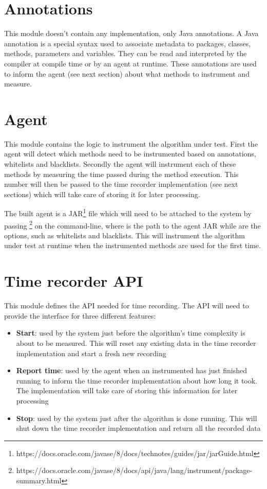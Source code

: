 \section{Annotations}
\label{sec:design:annotations}
This module doesn't contain any implementation, only Java annotations. A Java annotation is a special syntax used to associate metadata to packages, classes, methods, parameters and variables. They can be read and interpreted by the compiler at compile time or by an agent at runtime. These annotations are used to inform the agent (see next section) about what methods to instrument and measure.


\section{Agent}
\label{sec:design:agent}
This module contains the logic to instrument the algorithm under test. First the agent will detect which methods need to be instrumented based on annotations, whitelists and blacklists. Secondly the agent will instrument each of these methods by measuring the time passed during the method execution. This number will then be passed to the time recorder implementation (see next sections) which will take care of storing it for later processing.

\noindent The built agent is a JAR\footnote{https://docs.oracle.com/javase/8/docs/technotes/guides/jar/jarGuide.html} file which will need to be attached to the system by passing \footnote{https://docs.oracle.com/javase/8/docs/api/java/lang/instrument/package-summary.html} on the command-line, where  is the path to the agent JAR while  are the options, such as whitelists and blacklists. This will instrument the algorithm under test at runtime when the instrumented methods are used for the first time.


\section{Time recorder API}
This module defines the API needed for time recording. The API will need to provide the interface for three different features:
\begin{itemize}
  \item \textbf{Start}: used by the system just before the algorithm's time complexity is about to be measured. This will reset any existing data in the time recorder implementation and start a fresh new recording
  \item \textbf{Report time}: used by the agent when an instrumented has just finished running to inform the time recorder implementation about how long it took. The implementation will take care of storing this information for later processing
  \item \textbf{Stop}: used by the system just after the algorithm is done running. This will shut down the time recorder implementation and return all the recorded data
\end{itemize}

